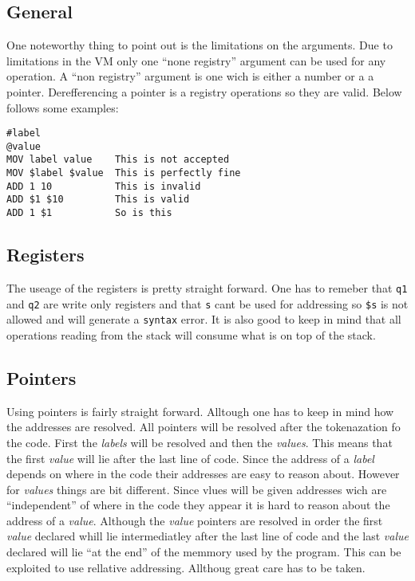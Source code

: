 \documentclass{article}
\newcommand{\V}{\verb}
\begin{document}
\subsection{General}
One noteworthy thing to point out is the limitations on the arguments. Due to
limitations in the VM only one ``none registry'' argument can be used for any
operation. A ``non registry'' argument is one wich is either a number or a
a pointer. Derefferencing a pointer is a registry operations so they are valid.
Below follows some examples:
\begin{verbatim}
#label
@value
MOV label value    This is not accepted
MOV $label $value  This is perfectly fine
ADD 1 10           This is invalid
ADD $1 $10         This is valid
ADD 1 $1           So is this
\end{verbatim}

\subsection{Registers}
The useage of the registers is pretty straight forward. One has to remeber that
\V+q1+ and \V+q2+ are write only registers and that \V+s+ cant be used for
addressing so \verb+$s+ is not allowed and will generate a \verb+syntax+ error.
It is also good to keep in mind that all operations reading from the stack will
consume what is on top of the stack.

\subsection{Pointers}
Using pointers is fairly straight forward. Alltough one has to keep in mind how
the addresses are resolved. All pointers will be resolved after the
tokenazation fo the code. First the \emph{labels} will be resolved and then the
\emph{values}.
This means that the first \emph{value} will lie after the last line of code. Since the
address of a \emph{label} depends on where in the code their addresses are easy to
reason about. However for \emph{values} things are bit different. Since vlues
will be given addresses wich are ``independent'' of where in the code they appear it is
hard to reason about the address of a \emph{value}. Although the \emph{value} pointers are
resolved in order the first \emph{value} declared whill lie intermediatley after the
last line of code and the last \emph{value} declared will lie ``at the end'' of the
memmory used by the program. This can be exploited to use rellative addressing.
Allthoug great care has to be taken.
\end{document}
